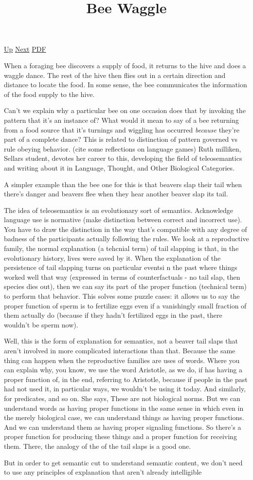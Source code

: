 \documentclass[12pt,a4paper]{report}
\begin{document}
 \href{doc/phil/PhilSituations.html}{Up} 
 \href{doc/phil/PhilSituations/ChildrensGame.html}{Next} 
 \href{doc/phil/PhilSituations/BeeWaggle.pdf}{PDF} 
\title{Bee Waggle}
When a foraging bee discovers a supply of food, it returns to the hive and does
a waggle dance. The rest of the hive then flies out in a certain direction and
distance to locate the food. In some sense, the bee communicates the information
of the food supply to the hive.

Can't we explain why a particular bee on one
occasion does that by invoking the pattern that
it's an instance of? What would it mean to say of
a bee returning from a food source that it's
turnings and wiggling has occurred \emph{because}
they're part of a complete dance? This is related
to distinction of pattern governed vs rule
obeying behavior. (cite some reflections on
language games) Ruth milliken, Sellars student,
devotes her career to this, developing the field
of teleosemantics and writing about it in
Language, Thought, and Other Biological
Categories.

A simpler example than the bee one for this is
that beavers slap their tail when there's danger
and beavers flee when they hear another beaver
slap its tail.

The idea of teleosemantics is an evolutionary
sort of semantics. Acknowledge language use is
normative (make distinction between correct and
incorrect use). You have to draw the distinction
in the way that's compatible with any degree of
badness of the participants actually following
the rules. We look at a reproductive family, the
normal explanation (a tehcnial term) of tail
slapping is that, in the evolutionary history,
lives were saved by it. When the explanation of
the persistence of tail slapping turns on
particular eventsi n the past where things worked
well that way (expressed in terms of
counterfactuals - no tail slap, then species dies
out), then we can say its part of the proper
function (technical term) to perform that
behavior. This  solves some puzzle cases: it
allows us to say the proper function of sperm is
to fertilize eggs even if a vanishingly small
fraction of them actually do (because if they
hadn't fertilized eggs in the past, there
wouldn't be sperm now).

Well, this is the form of explanation for semantics, not a beaver tail slaps
that aren't involved in more complicated interactions than that. Because the
same thing can happen when the reproductive families are uses of words. Where
you can explain why, you know, we use the word Aristotle, as we do, if has
having a proper function of, in the end, referring to Aristotle, because if
people in the past had not used it, in particular ways, we wouldn't be using
it today. And similarly, for predicates, and so on. She says, These are not
biological norms. But we can understand words as having proper functions in the
same sense in which even in the merely biological case, we can understand things
as having proper functions. And we can understand them as having proper
signaling functions. So there's a proper function for producing these things
and a proper function for receiving them. There, the analogy of the of the tail
slaps is a good one.

But in order to get semantic cut to understand semantic content, we don't need
to use any principles of explanation that aren't already intelligible
\end{document}
